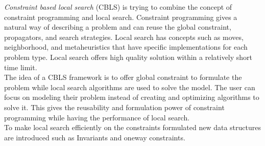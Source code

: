 \emph{Constraint based local search} (CBLS) is trying to combine the concept of constraint programming and local 
search. Constraint programming gives a natural way of describing a problem and can reuse the global constraint, 
propagators, and search strategies. Local search has concepts such as moves, neighborhood, and metaheuristics that have 
specific implementations for each problem type. Local search offers high quality solution within a relatively short time 
limit. \\ 
The idea of a CBLS framework is to offer global constraint to formulate the problem while local search algorithms are 
used to solve the model. The user can focus on modeling their problem instead of creating and optimizing 
algorithms to solve it. This gives the reusability and formulation power of constraint programming while having the 
performance of local search.   \\ 
To make local search efficiently on the constraints formulated new data structures are introduced such as Invariants 
and oneway constraints. 